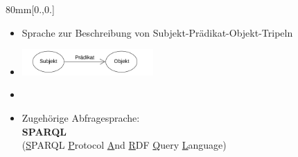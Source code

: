 \documentclass[
	ngerman,
	10pt,				%
	aspectratio=169 	%
]{beamer}
\begin{document}
\begin{frame}[label=wr3]
\begin{textblock*}{80mm}[0.,0.]
{ 
  \begin{itemize}
   \item Sprache zur Beschreibung von Subjekt-Prädikat-Objekt-Tripeln
   \item[] \hspace{50mm} \includegraphics[width=50mm]{img/langde-1920px-Basic_RDF_Graph}
%    
   \item[] 
   \item Zugehörige Abfragesprache:\\
   
   \smallskip
   \textbf{SPARQL} \\
   
   \smallskip
   (\underline{S}PARQL \underline{P}rotocol \underline{A}nd \underline{R}DF \underline{Q}uery \underline{L}anguage)

  \end{itemize}
  
  }

\end{textblock*}
% 

\end{frame}



\end{document}
